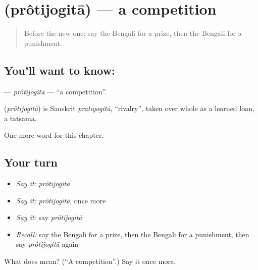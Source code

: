 \section[\texorpdfstring{\bn{প্রতিযোগিতা} (prôtijogitā)}{প্রতিযোগিতা (prôtijogitā)}]{ (prôtijogitā) — a competition}

\label{lesson:BN-C260-protijogita}



\begin{quote}
Before the new one: say the Bengali for a prize, then the Bengali for a punishment.
\end{quote}

\subsection*{You'll want to know: }
\textbf{} — \emph{prôtijogitā} — \textquotedblleft{}a competition\textquotedblright{}.

\begin{cousinweb}
\textbf{} (\emph{prôtijogitā}) is Sanskrit \emph{pratiyogitā}, \textquotedblleft{}rivalry\textquotedblright{}, taken over whole as a learned loan, a tatsama.
\end{cousinweb}

\begin{grammarlens}[title={What you've built}]
One more word for this chapter.
\end{grammarlens}

\subsection*{Your turn}
\begin{itemize}
\raggedright
  \item \emph{Say it:} \emph{prôtijogitā}
  \item \emph{Say it:} \emph{prôtijogitā}, once more
  \item \emph{Say it:} say \emph{prôtijogitā}
  \item \emph{Recall:} say the Bengali for a prize, then the Bengali for a punishment, then say \emph{prôtijogitā} again
\end{itemize}

\begin{tcolorbox}[breakable,colback=teal!4,colframe=teal!35!black,title={Before you move on}]
What does  mean? (\textquotedblleft{}A competition\textquotedblright{}.) Say it once more.
\end{tcolorbox}
